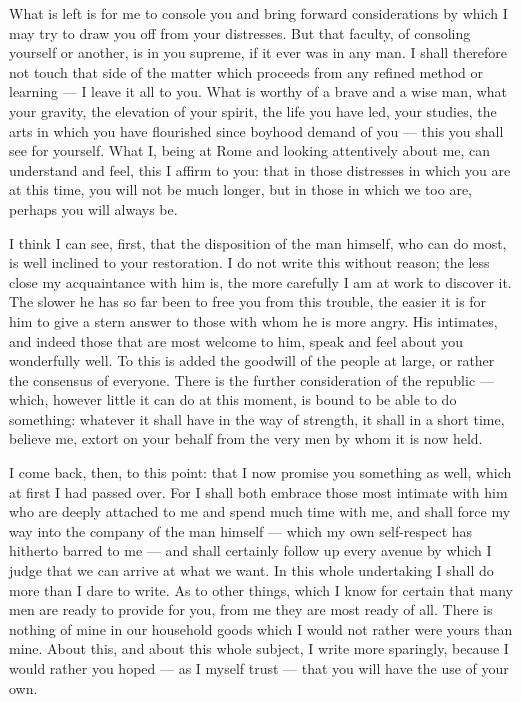  What is left is for me to console you and bring forward considerations by which I may try to draw you off from your distresses. But that faculty, of consoling yourself or another, is in you supreme, if it ever was in any man. I shall therefore not touch that side of the matter which proceeds from any refined method or learning --- I leave it all to you. What is worthy of a brave and a wise man, what your gravity, the elevation of your spirit, the life you have led, your studies, the arts in which you have flourished since boyhood demand of you --- this you shall see for yourself. What I, being at Rome and looking attentively about me, can understand and feel, this I affirm to you: that in those distresses in which you are at this time, you will not be much longer, but in those in which we too are, perhaps you will always be.

 I think I can see, first, that the disposition of the man himself, who can do most, is well inclined to your restoration. I do not write this without reason; the less close my acquaintance with him is, the more carefully I am at work to discover it. The slower he has so far been to free you from this trouble, the easier it is for him to give a stern answer to those with whom he is more angry. His intimates, and indeed those that are most welcome to him, speak and feel about you wonderfully well. To this is added the goodwill of the people at large, or rather the consensus of everyone. There is the further consideration of the republic --- which, however little it can do at this moment, is bound to be able to do something: whatever it shall have in the way of strength, it shall in a short time, believe me, extort on your behalf from the very men by whom it is now held.

 I come back, then, to this point: that I now promise you something as well, which at first I had passed over. For I shall both embrace those most intimate with him who are deeply attached to me and spend much time with me, and shall force my way into the company of the man himself --- which my own self-respect has hitherto barred to me --- and shall certainly follow up every avenue by which I judge that we can arrive at what we want. In this whole undertaking I shall do more than I dare to write. As to other things, which I know for certain that many men are ready to provide for you, from me they are most ready of all. There is nothing of mine in our household goods which I would not rather were yours than mine. About this, and about this whole subject, I write more sparingly, because I would rather you hoped --- as I myself trust --- that you will have the use of your own.

